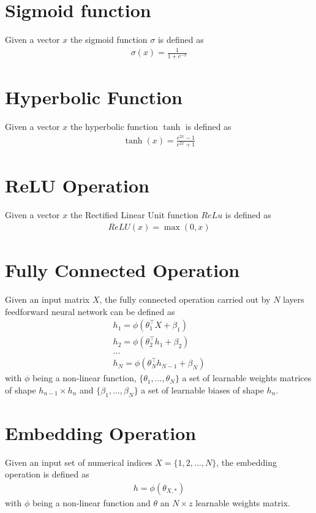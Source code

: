 \section{Sigmoid function}
Given a vector $x$ the sigmoid function $\sigma$ is defined as 
\begin{gather}
    \label{sigmoid}
    \sigma(x) = \frac {1} {1 + e^{-x}}
\end{gather}

\section{Hyperbolic Function}
Given a vector $x$ the hyperbolic function $\tanh$ is defined as 
\begin{gather}
    \label{tanh}
    \tanh(x) = \frac {e^{2x} -1} {e^{2x} +1}
\end{gather}

\section{ReLU Operation}
Given a vector $x$ the Rectified Linear Unit function $ReLu$ is defined as 
\begin{gather}
    \label{relu}
    ReLU(x) = \max(0, x)
\end{gather}

\section{Fully Connected Operation}
Given an input matrix $X$, the fully connected operation carried out by $N$ layers feedforward neural network can be defined as
\begin{gather}
    \label{fnn_operation}
    h_1 = \phi(\theta_1^\top X + \beta_1)\\ \nonumber
    h_2 = \phi(\theta_2^\top h_1  + \beta_2)\\ \nonumber
    \dots\\ \nonumber
    h_N = \phi(\theta_N^\top h_{N-1}  + \beta_N) \nonumber
\end{gather}
with $\phi$ being a non-linear function, $\{\theta_1, \dots, \theta_N\}$ a set of learnable weights matrices of shape $h_{n-1} \times h_{n}$  and $\{\beta_1, \dots, \beta_N\}$ a set of learnable biases of shape $h_n$.

\section{Embedding Operation}
Given an input set of numerical indices $X = \{1, 2, \dots, N\}$, the embedding operation is defined as 
\begin{gather}
    \label{embedding_operation}
    h = \phi(\theta_{X,*})
\end{gather}
with $\phi$ being a non-linear function and $\theta$ an $N \times z$ learnable weights matrix.

